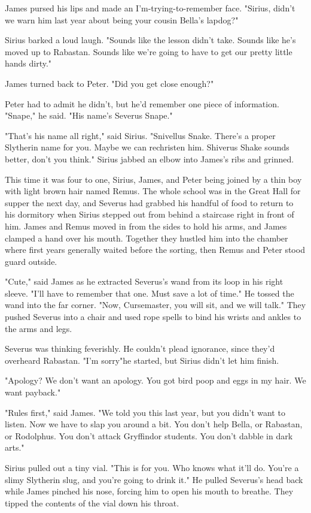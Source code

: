 James pursed his lips and made an I'm-trying-to-remember face. "Sirius, didn't we warn him last year about being your cousin Bella's lapdog?"

Sirius barked a loud laugh. "Sounds like the lesson didn't take. Sounds like he's moved up to Rabastan. Sounds like we're going to have to get our pretty little hands dirty."

James turned back to Peter. "Did you get close enough?"

Peter had to admit he didn't, but he'd remember one piece of information. "Snape," he said. "His name's Severus Snape."

"That's his name all right," said Sirius. "Snivellus Snake. There's a proper Slytherin name for you. Maybe we can rechristen him. Shiverus Shake sounds better, don't you think." Sirius jabbed an elbow into James's ribs and grinned.

This time it was four to one, Sirius, James, and Peter being joined by a thin boy with light brown hair named Remus. The whole school was in the Great Hall for supper the next day, and Severus had grabbed his handful of food to return to his dormitory when Sirius stepped out from behind a staircase right in front of him. James and Remus moved in from the sides to hold his arms, and James clamped a hand over his mouth. Together they hustled him into the chamber where first years generally waited before the sorting, then Remus and Peter stood guard outside.

"Cute," said James as he extracted Severus's wand from its loop in his right sleeve. "I'll have to remember that one. Must save a lot of time." He tossed the wand into the far corner. "Now, Cursemaster, you will sit, and we will talk." They pushed Severus into a chair and used rope spells to bind his wrists and ankles to the arms and legs.

Severus was thinking feverishly. He couldn't plead ignorance, since they'd overheard Rabastan. "I'm sorry{\el}"he started, but Sirius didn't let him finish.

"Apology? We don't want an apology. You got bird poop and eggs in my hair. We want payback."

"Rules first," said James. "We told you this last year, but you didn't want to listen. Now we have to slap you around a bit. You don't help Bella, or Rabastan, or Rodolphus. You don't attack Gryffindor students. You don't dabble in dark arts."

Sirius pulled out a tiny vial. "This is for you. Who knows what it'll do. You're a slimy Slytherin slug, and you're going to drink it." He pulled Severus's head back while James pinched his nose, forcing him to open his mouth to breathe. They tipped the contents of the vial down his throat.

